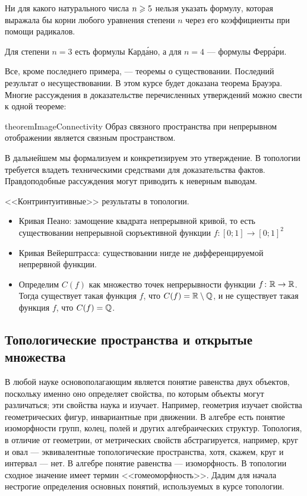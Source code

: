 \documentclass[main]{subfiles}
\begin{document}
\begin{theorem*}
	Ни для какого натурального числа $ n \geqslant 5 $ нельзя указать формулу,
	которая выражала бы корни любого уравнения степени $ n $ через его коэффициенты при помощи радикалов.
\end{theorem*}

\begin{remark}
	Для степени $ n = 3 $ есть формулы Кард\'{а}но, а для $ n = 4 $ --- формулы Ферр\'{а}ри.
\end{remark}

Все, кроме последнего примера, --- теоремы о существовании. Последний результат о несуществовании. В этом курсе будет
доказана теорема Брауэра. Многие рассуждения в доказательстве перечисленных утверждений можно свести к одной теореме:

\begin{restatable}{theorem}{ImageConnectivity}
	Образ связного пространства при непрерывном отображении является связным пространством.
\end{restatable}

В дальнейшем мы формализуем и конкретизируем это утверждение. В топологии требуется владеть техническими средствами
для доказательства фактов. Правдоподобные рассуждения могут приводить к неверным выводам.

\begin{example} <<Контринтуитивные>> результаты в топологии.
	\begin{itemize}
	\item Кривая Пеано: замощение квадрата непрерывной кривой, то есть
		существовании непрерывной сюръективной функции $ f \colon [0; 1] \to [0; 1]^2 $
	\item Кривая Вейерштрасса: существовании нигде не дифференцируемой непрервной функции.
	\item Определим $ C(f) $ как множество точек непрерывности функции $ f \colon \mathbb{R} \to \mathbb{R} $. Тогда существует такая
		функция $ f $, что $ C(f) = \mathbb{R} \setminus \mathbb{Q} $, и не существует такая функция $ f $, что $ C(f) = \mathbb{Q} $.
	\end{itemize}
\end{example}

\subsection{Топологические пространства и открытые множества}

В любой науке основополагающим является понятие равенства двух объектов, поскольку именно оно определяет свойства,
по которым объекты могут различаться; эти свойства наука и изучает. Например, геометрия изучает свойства
геометрических фигур, инвариантные при движении. В алгебре есть понятие изоморфности групп, колец, полей и других
алгебраических структур. Топология, в отличие от геометрии, от метрических свойств абстрагируется, например, круг и
овал --- эквивалентные топологические пространства, хотя, скажем, круг и интервал --- нет. В алгебре понятие равенства
--- изоморфность. В топологии сходное значение имеет термин <<гомеоморфность>>. Дадим для начала нестрогие определения
основных понятий, используемых в курсе топологии.
\end{document}

